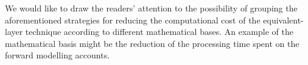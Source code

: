 We would like to draw the readers' attention to the possibility of grouping the aforementioned strategies for reducing the computational cost of the equivalent-layer technique according to different mathematical bases.
An example of the mathematical basis might be the reduction of the processing time spent on the forward modelling accounts. 





